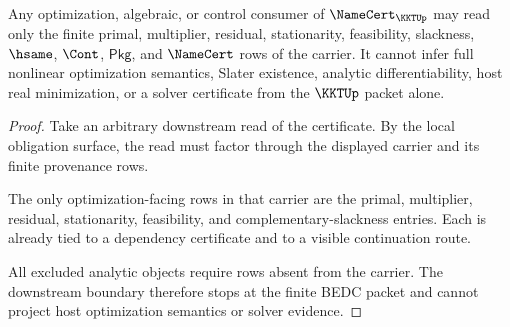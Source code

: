 \begin{theorem}
\label{thm:kkt-downstream-consumer-boundary}
Any optimization, algebraic, or control consumer of $\NameCert_{\KKTUp}$ may read only the finite primal, multiplier, residual, stationarity, feasibility, slackness, $\hsame$, $\Cont$, $\mathsf{Pkg}$, and $\NameCert$ rows of the carrier. It cannot infer full nonlinear optimization semantics, Slater existence, analytic differentiability, host real minimization, or a solver certificate from the $\KKTUp$ packet alone.
\end{theorem}
\begin{proof}
Take an arbitrary downstream read of the certificate. By the local obligation surface, the read must factor through the displayed carrier and its finite provenance rows.

The only optimization-facing rows in that carrier are the primal, multiplier, residual, stationarity, feasibility, and complementary-slackness entries. Each is already tied to a dependency certificate and to a visible continuation route.

All excluded analytic objects require rows absent from the carrier. The downstream boundary therefore stops at the finite BEDC packet and cannot project host optimization semantics or solver evidence.
\end{proof}


